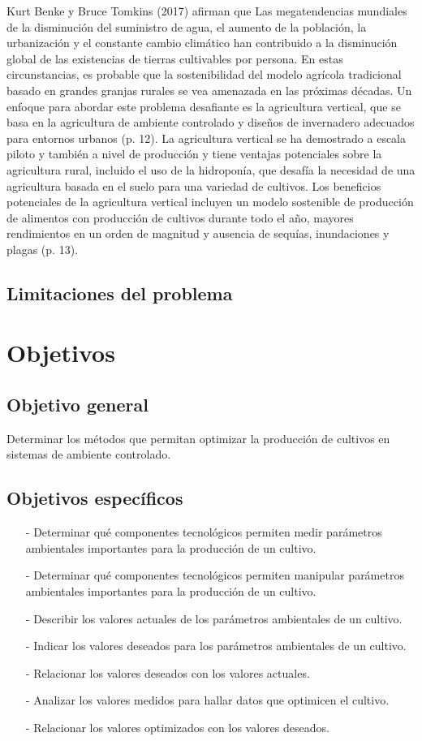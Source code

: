 \documentclass{report}
\begin{document}
\begin{enumerate}
  Kurt Benke y Bruce Tomkins (2017) afirman que Las megatendencias mundiales de
  la disminución del suministro de agua, el aumento de la población, la
  urbanización y el constante cambio climático han contribuido a la disminución
  global de las existencias de tierras cultivables por persona. En estas
  circunstancias, es probable que la sostenibilidad del modelo agrícola
  tradicional basado en grandes granjas rurales se vea amenazada en las próximas
  décadas. Un enfoque para abordar este problema desafiante es la agricultura
  vertical, que se basa en la agricultura de ambiente controlado y diseños de
  invernadero adecuados para entornos urbanos (p. 12). La agricultura vertical
  se ha demostrado a escala piloto y también a nivel de producción y tiene
  ventajas potenciales sobre la agricultura rural, incluido el uso de la
  hidroponía, que desafía la necesidad de una agricultura basada en el suelo
  para una variedad de cultivos. Los beneficios potenciales de la agricultura
  vertical incluyen un modelo sostenible de producción de alimentos con
  producción de cultivos durante todo el año, mayores rendimientos en un orden
  de magnitud y ausencia de sequías, inundaciones y plagas (p. 13).
\end{enumerate}
\subsection{Limitaciones del problema}
\section{Objetivos}
\subsection{Objetivo general}
Determinar los métodos que permitan optimizar la producción de cultivos en
sistemas de ambiente controlado.
\subsection{Objetivos específicos}
\begin{enumerate}
\item[-] Determinar qué componentes tecnológicos permiten medir parámetros
  ambientales importantes para la producción de un cultivo.
\item[-] Determinar qué componentes tecnológicos permiten manipular parámetros
  ambientales importantes para la producción de un cultivo.
\item[-] Describir los valores actuales de los parámetros ambientales de un
  cultivo.
\item[-] Indicar los valores deseados para los parámetros ambientales de un
  cultivo.
\item[-] Relacionar los valores deseados con los valores actuales.
\item[-] Analizar los valores medidos para hallar datos que optimicen el cultivo.
\item[-] Relacionar los valores optimizados con los valores deseados.
\end{enumerate}
\end{document}
